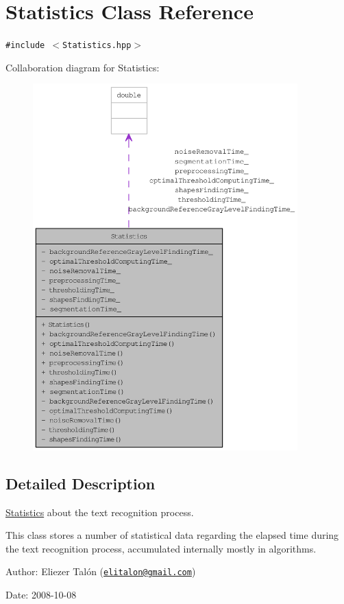 \hypertarget{class_statistics}{
\section{Statistics Class Reference}
\label{class_statistics}
}
{\tt \#include $<$Statistics.hpp$>$}

Collaboration diagram for Statistics:\nopagebreak
\begin{figure}[H]
\begin{center}
\leavevmode
\includegraphics[height=400pt]{class_statistics__coll__graph}
\end{center}
\end{figure}


\subsection{Detailed Description}
\hyperlink{class_statistics}{Statistics} about the text recognition process. 

This class stores a number of statistical data regarding the elapsed time during the text recognition process, accumulated internally mostly in algorithms.

\begin{Desc}
\item[Author:]Eliezer Talón (\href{mailto:elitalon@gmail.com}{\tt elitalon@gmail.com}) \end{Desc}
\begin{Desc}
\item[Date:]2008-10-08 \end{Desc}



